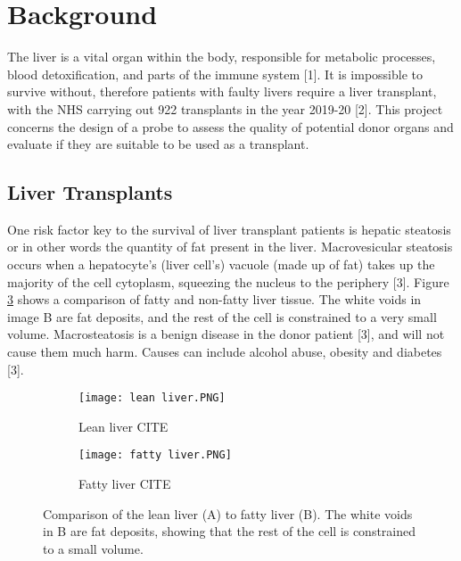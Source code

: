 \section{Background}

The liver is a vital organ within the body, responsible for metabolic processes, blood detoxification, and parts of the immune system [1]. It is impossible to survive without, therefore patients with faulty livers require a liver transplant, with the NHS carrying out 922 transplants in the year 2019-20 [2]. This project concerns the design of a probe to assess the quality of potential donor organs and evaluate if they are suitable to be used as a transplant.


\subsection{Liver Transplants}
One risk factor key to the survival of liver transplant patients is hepatic steatosis or in other words the quantity of fat present in the liver. Macrovesicular steatosis occurs when a hepatocyte’s (liver cell’s) vacuole (made up of fat) takes up the majority of the cell cytoplasm, squeezing the nucleus to the periphery [3]. Figure \ref{fig: livers} shows a comparison of fatty and non-fatty liver tissue. The white voids in image B are fat deposits, and the rest of the cell is constrained to a very small volume. Macrosteatosis is a benign disease in the donor patient [3], and will not cause them much harm. Causes can include alcohol abuse, obesity and diabetes [3].\\

\begin{figure}[htbp]
	\centering
	\begin{subfigure}[b]{0.4\linewidth}
		\texttt{[image: lean liver.PNG]}
		\caption{Lean liver CITE}
		\label{}
	\end{subfigure}
	\begin{subfigure}[b]{0.4\linewidth}
		\texttt{[image: fatty liver.PNG]}
		\caption{Fatty liver CITE}
		\label{}
	\end{subfigure}
	\caption{Comparison of the lean liver (A) to fatty liver (B). The white voids in B are fat deposits, showing that the rest of the cell is constrained to a small volume.}
	\label{fig: livers}
\end{figure}	


